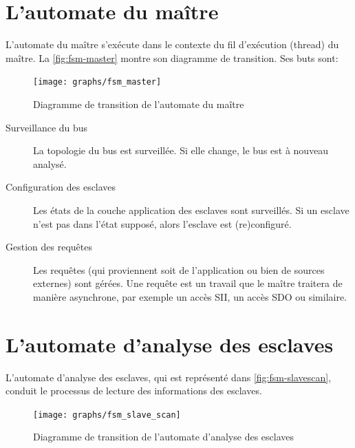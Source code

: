 \documentclass[a4paper,12pt,BCOR6mm,bibtotoc,idxtotoc]{scrbook}
\begin{document}
\section{L'automate du ma\^itre}
\label{sec:fsm-master}

L'automate du ma\^itre s'ex\'ecute dans le contexte du fil d'ex\'ecution
(thread) du ma\^itre. La \autoref{fig:fsm-master} montre son diagramme de
transition. Ses buts sont:

\begin{figure}[htbp]
  \centering
  \texttt{[image: graphs/fsm\_master]}
  \caption{Diagramme de transition de l'automate du ma\^itre}
  \label{fig:fsm-master}
\end{figure}

\begin{description}

\item[Surveillance du bus] La topologie du bus est surveill\'ee. Si elle
  change, le bus est \`a nouveau analys\'e.

\item[Configuration des esclaves] Les \'etats de la couche application
  des esclaves sont surveill\'es. Si un esclave n'est pas dans l'\'etat
  suppos\'e, alors l'esclave est (re)configur\'e.

\item[Gestion des requ\^etes] Les requ\^etes (qui proviennent soit de
  l'application ou bien de sources externes) sont g\'er\'ees.  Une requ\^ete
  est un travail que le ma\^itre traitera de mani\`ere asynchrone, par
  exemple un acc\`es SII, un acc\`es SDO ou similaire.

\end{description}


\section{L'automate d'analyse des esclaves}
\label{sec:fsm-scan}

L'automate d'analyse des esclaves, qui est repr\'esent\'e dans
\autoref{fig:fsm-slavescan}, conduit le processus de lecture des
informations des esclaves.

\begin{figure}[htbp]
  \centering
  \texttt{[image: graphs/fsm\_slave\_scan]}
  \caption{Diagramme de transition de l'automate d'analyse des esclaves}
  \label{fig:fsm-slavescan}
\end{figure}
\end{document}
